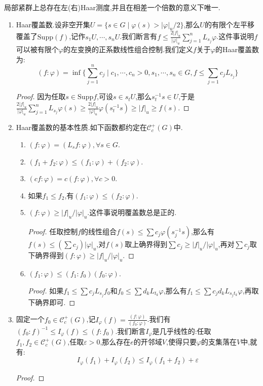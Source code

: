 局部紧群上总存在左(右)Haar测度,并且在相差一个倍数的意义下唯一.
\begin{enumerate}
	\item Haar覆盖数.设非空开集$U=\{s\in G\mid\varphi(s)>|\varphi|_u/2\}$,那么$U$的有限个左平移覆盖了$\mathrm{Supp}(f)$,记作$s_1U,\cdots,s_nU$.我们断言有$f\le\frac{2|f|_u}{|\varphi|_u}\sum_{j=1}^nL_{s_j}\varphi$.这件事说明$f$可以被有限个$\varphi$的左变换的正系数线性组合控制.我们定义$f$关于$\varphi$的Haar覆盖数为:
	$$(f:\varphi)=\inf\{\sum_{j=1}^nc_j\mid c_1,\cdots,c_n>0,s_1,\cdots,s_n\in G,f\le\sum_{j=1}c_jL_{s_j}\}$$
	\begin{proof}
		
		因为任取$s\in\mathrm{Supp}f$,可设$s\in s_tU$,那么$s_t^{-1}s\in U$,于是$\frac{2|f|_u}{|\varphi|_u}\sum_{j=1}^nL_{s_j}\varphi(s)\ge\frac{2|f|_u}{|\varphi|_u}\varphi(s_t^{-1}s)\ge|f|_u\ge f(s)$.
	\end{proof}
    \item Haar覆盖数的基本性质.如下函数都约定在$\mathscr{C}_c^+(G)$中.
    \begin{enumerate}
    	\item $(f:\varphi)=(L_sf:\varphi),\forall s\in G$.
    	\item $(f_1+f_2:\varphi)\le(f_1:\varphi)+(f_2:\varphi)$.
    	\item $(cf:\varphi)=c(f:\varphi),\forall c>0$.
    	\item 如果$f_1\le f_2$,有$(f_1:\varphi)\le(f_2:\varphi)$.
    	\item $(f:\varphi)\ge|f|_u/|\varphi|_u$.这件事说明覆盖数总是正的.
    	\begin{proof}
    		
    		任取控制$f$的线性组合$f(s)\le\sum c_j\varphi(s_j^{-1}s)$,那么有$f(s)\le(\sum c_j)|\varphi|_u$,对$f(s)$取上确界得到$\sum c_j\ge|f|_u/|\varphi|_u$,再对$\sum c_j$取下确界得到$(f:\varphi)\ge|f|_u/|\varphi|_u$.
    	\end{proof}
        \item $(f_1:\varphi)\le(f_1:f_0)(f_0:\varphi)$.
        \begin{proof}
        	
        	如果$f_1\le\sum c_jL_{s_j}f_0$和$f_0\le\sum d_kL_{t_k}\varphi$,那么有$f_1\le\sum c_jd_kL_{s_jt_k}\varphi$,再取下确界即可.
        \end{proof}
    \end{enumerate}
    \item 固定一个$f_0\in\mathscr{C}_c^+(G)$,记$I_{\varphi}(f)=\frac{(f:\varphi)}{(f_0:\varphi)}$.我们有$(f_0:f)^{-1}\le I_{\varphi}(f)\le(f:f_0)$.我们断言$I_{\varphi}$是几乎线性的:任取$f_1,f_2\in\mathscr{C}_c^+(G)$,任取$\varepsilon>0$,那么存在$e$的开邻域$V$,使得只要$\varphi$的支集落在$V$中,就有:
    $$I_{\varphi}(f_1)+I_{\varphi}(f_2)\le I_{\varphi}(f_1+f_2)+\varepsilon$$
    \begin{proof}
    	

\end{proof}
\end{enumerate}
